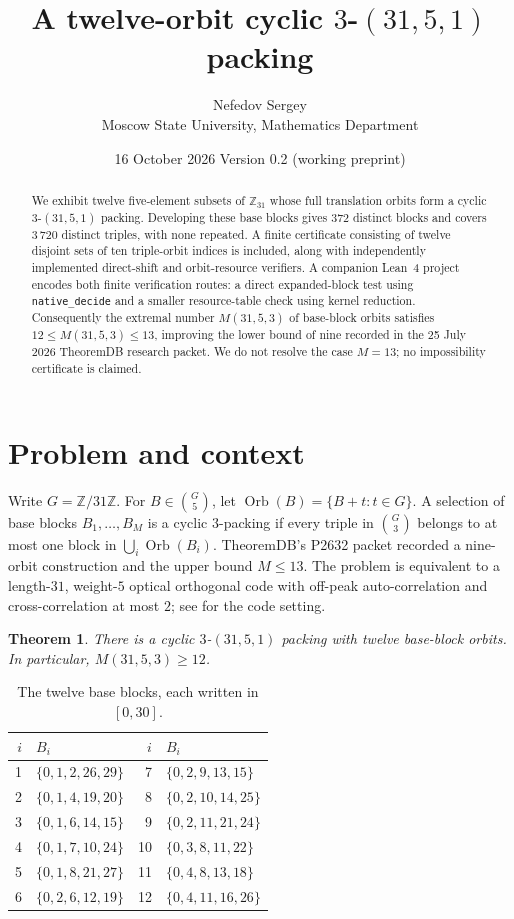 \documentclass[11pt,a4paper]{article}
\title{A twelve-orbit cyclic $3$-$(31,5,1)$ packing}
\author{Nefedov Sergey\\[3pt]{\small Moscow State University, Mathematics Department}}
\date{16 October 2026 \quad Version 0.2 (working preprint)}
\newtheorem{theorem}{Theorem}
\newcommand{\ZZ}{\mathbb Z}
\begin{document}
\maketitle
\begin{abstract}
We exhibit twelve five-element subsets of $\ZZ_{31}$ whose full
translation orbits form a cyclic $3$-$(31,5,1)$ packing.  Developing these
base blocks gives $372$ distinct blocks and covers $3\,720$ distinct
triples, with none repeated. A finite certificate consisting of twelve disjoint sets of ten
triple-orbit indices is included, along with independently implemented
direct-shift and orbit-resource verifiers. A companion Lean~4 project
encodes both finite verification routes: a direct expanded-block test
using \texttt{native\_decide} and a smaller resource-table check
using kernel reduction.
Consequently the extremal number $M(31,5,3)$ of base-block orbits
satisfies $12\leq M(31,5,3)\leq13$, improving the lower bound of nine
recorded in the 25 July 2026 TheoremDB research packet. We do not
resolve the case $M=13$; no impossibility certificate is claimed.
\end{abstract}

\section{Problem and context}
Write $G=\ZZ/31\ZZ$. For $B\in\binom{G}{5}$, let
$\operatorname{Orb}(B)=\{B+t:t\in G\}$. A selection of base
blocks $B_1,\ldots,B_M$ is a cyclic $3$-packing if every triple in
$\binom{G}{3}$ belongs to at most one block in
$\bigcup_i\operatorname{Orb}(B_i)$. TheoremDB's P2632 packet
\cite{theoremdb} recorded a nine-orbit construction and the upper bound
$M\leq13$. The problem is equivalent to a length-$31$, weight-$5$
optical orthogonal code with off-peak auto-correlation and
cross-correlation at most $2$; see \cite{chung,chu} for the code setting.

\begin{theorem}\label{thm:main}
There is a cyclic $3$-$(31,5,1)$ packing with twelve base-block orbits.
In particular, $M(31,5,3)\geq12$.
\end{theorem}

\begin{table}[ht]
\centering
\caption{The twelve base blocks, each written in $[0,30]$.}
\label{tab:blocks}
\renewcommand{\arraystretch}{1.13}
\begin{tabular}{r l @{\qquad} r l}
\toprule
$i$ & $B_i$ & $i$ & $B_i$\\
\midrule
 1 & $\{0,1,2,26,29\}$ & 7 & $\{0,2,9,13,15\}$\\
 2 & $\{0,1,4,19,20\}$ & 8 & $\{0,2,10,14,25\}$\\
 3 & $\{0,1,6,14,15\}$ & 9 & $\{0,2,11,21,24\}$\\
 4 & $\{0,1,7,10,24\}$ &10 & $\{0,3,8,11,22\}$\\
 5 & $\{0,1,8,21,27\}$ &11 & $\{0,4,8,13,18\}$\\
 6 & $\{0,2,6,12,19\}$ &12 & $\{0,4,11,16,26\}$\\
\bottomrule
\end{tabular}
\end{table}
\end{document}

